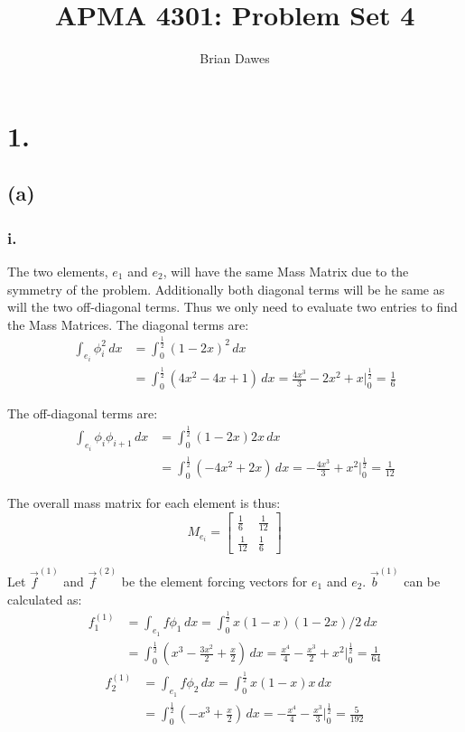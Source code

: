 \documentclass{article}
\begin{document}
\title{APMA 4301: Problem Set 4}
\author{Brian Dawes}
\maketitle

\section*{1.}
\subsection*{(a)}
\subsubsection*{i.}
The two elements, $e_1$ and $e_2$, will have the same Mass Matrix due to the symmetry of the problem. Additionally both diagonal terms will be he same as will the two off-diagonal terms. Thus we only need to evaluate two entries to find the Mass Matrices. The diagonal terms are:
\begin{align}
\int_{e_i}\phi_i^2\,dx &=\int_0^\frac 1 2 (1-2x)^2\,dx \\
&= \int_0^\frac 1 2 (4x^2-4x+1)\,dx=\frac{4x^3}3-2x^2+x\Big|_0^\frac 1 2 = \frac 1 6
\end{align}

The off-diagonal terms are:
\begin{align}
\int_{e_i}\phi_i\phi_{i+1}\,dx &=\int_0^\frac 1 2 (1-2x)2x\,dx \\
&= \int_0^\frac 1 2 (-4x^2+2x)\,dx = -\frac{4x^3}3+x^2 \Big|_0^\frac 1 2 = \frac 1{12}
\end{align}

The overall mass matrix for each element is thus:
\begin{equation}
\boxed{M_{e_i}=
\begin{bmatrix}
\frac 1 6 & \frac 1{12} \\[1ex]
\frac 1{12} & \frac 1 6
\end{bmatrix}
}
\end{equation}

Let $\vec f^{(1)}$ and $\vec f^{(2)}$ be the element forcing vectors for $e_1$ and $e_2$. $\vec b^{(1)}$ can be calculated as:
\begin{align}
f^{(1)}_1&=\int_{e_1} f\phi_1\,dx=\int_0^\frac{1}{2} x(1-x)(1-2x)/2\,dx \\
&=\int_0^\frac{1}{2} \left(x^3-\frac{3x^2}2+\frac x 2\right)\,dx=\frac{x^4}4-\frac{x^3}2+x^2\Big|_0^\frac 12 = \frac{1}{64}
\end{align}
\begin{align}
f^{(1)}_2&=\int_{e_1} f\phi_2\,dx=\int_0^\frac{1}{2} x(1-x)x\,dx \\
&=\int_0^\frac{1}{2} \left(-x^3+\frac x 2\right)\,dx=-\frac{x^4}4-\frac{x^3}3\Big|_0^\frac 12 = \frac{5}{192}
\end{align}
\end{document}
